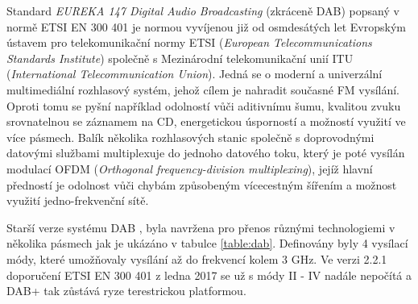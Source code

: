 Standard \textit{EUREKA 147 Digital Audio Broadcasting} (zkráceně DAB) popsaný v normě ETSI EN 300 401\cite{etsi:dab} je normou vyvíjenou již od osmdesátých let Evropským ústavem pro telekomunikační normy ETSI (\textit{European Telecommunications Standards Institute}) společně s Mezinárodní telekomunikační unií ITU (\textit{International Telecommunication Union}). Jedná se o moderní a univerzální multimediální rozhlasový systém, jehož cílem je nahradit současné FM vysílání. Oproti tomu se pyšní například odolností vůči aditivnímu šumu, kvalitou zvuku srovnatelnou se záznamem na CD, energetickou úsporností a možností využití ve více pásmech. Balík několika rozhlasových stanic společně s doprovodnými datovými službami multiplexuje do jednoho datového toku, který je poté vysílán modulací OFDM (\textit{Orthogonal frequency-division multiplexing}), jejíž hlavní předností je odolnost vůči chybám způsobeným vícecestným šířením a možnost využití jedno-frekvenční sítě.


Starší verze systému DAB \cite{etsi:dab:old}, byla navržena pro přenos různými technologiemi v několika pásmech jak je ukázáno v tabulce \ref{table:dab}. Definovány byly 4 vysílací módy, které umožňovaly vysílání až do frekvencí kolem 3 GHz. Ve verzi 2.2.1 doporučení ETSI EN 300 401 \cite{etsi:dab} z ledna 2017 se už s módy II - IV nadále nepočítá a DAB+ tak zůstává ryze terestrickou platformou.

